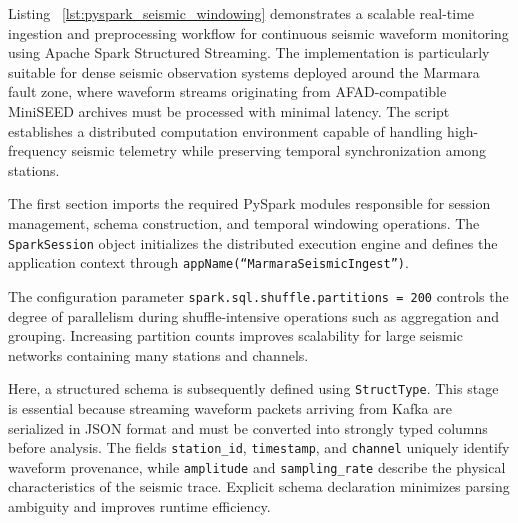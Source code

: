 \documentclass[data,article,accept,pdftex,moreauthors]{Definitions/mdpi}
\begin{document}
Listing %
~\ref{lst:pyspark_seismic_windowing} demonstrates a scalable real-time ingestion and preprocessing workflow for continuous seismic waveform monitoring using Apache Spark Structured Streaming. The implementation is particularly suitable for dense seismic observation systems deployed around the Marmara fault zone, where waveform streams originating from AFAD-compatible MiniSEED archives must be processed with minimal latency. The script establishes a distributed computation environment capable of handling high-frequency seismic telemetry while preserving temporal synchronization among stations.

The first section imports the required PySpark modules responsible for session management, schema construction, and temporal windowing operations. The \texttt{SparkSession} object initializes the distributed execution engine and defines the application context through
\texttt{appName(``MarmaraSeismicIngest'')}. 

The configuration parameter
\texttt{spark.sql.shuffle.partitions = 200}
controls the degree of parallelism during shuffle-intensive operations such as aggregation and grouping. Increasing partition counts improves scalability for large seismic networks containing many stations and channels.

Here, a structured schema is subsequently defined using \texttt{StructType}. This stage is essential because streaming waveform packets arriving from Kafka are serialized in JSON format and must be converted into strongly typed columns before analysis. The fields \texttt{station\_id}, \texttt{timestamp}, and \texttt{channel} uniquely identify waveform provenance, while \texttt{amplitude} and \texttt{sampling\_rate} describe the physical characteristics of the seismic trace. Explicit schema declaration minimizes parsing ambiguity and improves runtime efficiency.
\end{document}
